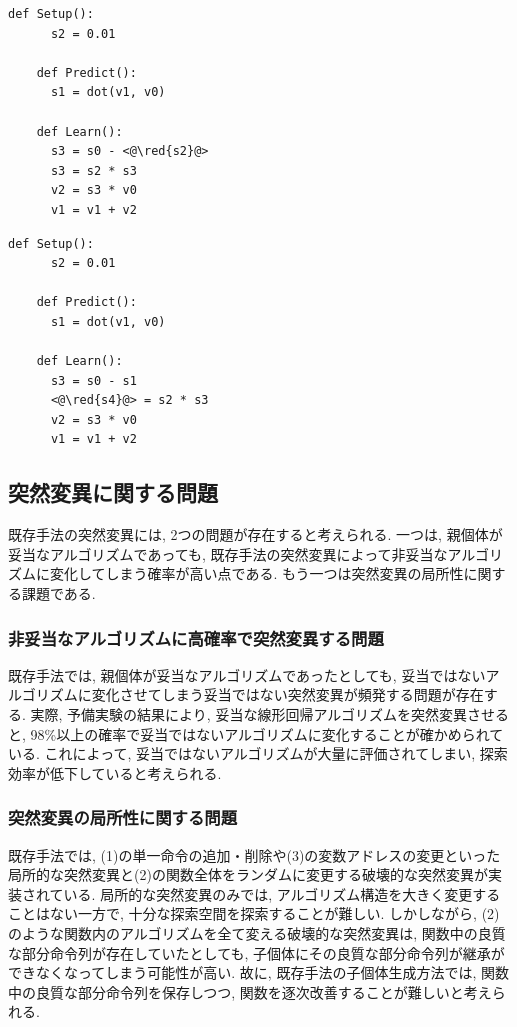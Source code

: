 \documentclass[11pt,oneside,openany,report]{jsbook}
\newcommand{\red}[1]{\textcolor{red}{#1}}
\begin{document}
\begin{multicols}{2}
  \begin{lstlisting}[caption=妥当なアルゴリズムの条件1の(c)を満たさない非妥当なアルゴリズム. ,label=code:invalid_algorithm_6]
    def Setup():
      s2 = 0.01

    def Predict():
      s1 = dot(v1, v0)

    def Learn():
      s3 = s0 - <@\red{s2}@>
      s3 = s2 * s3
      v2 = s3 * v0
      v1 = v1 + v2
  \end{lstlisting}

  \columnbreak

  \begin{lstlisting}[caption=妥当なアルゴリズムの条件3を満たさない非妥当なアルゴリズム,label=code:invalid_algorithm_7]
    def Setup():
      s2 = 0.01

    def Predict():
      s1 = dot(v1, v0)

    def Learn():
      s3 = s0 - s1
      <@\red{s4}@> = s2 * s3
      v2 = s3 * v0
      v1 = v1 + v2
  \end{lstlisting}
\end{multicols}

\subsection{突然変異に関する問題}\label{subsec:problem:existing_problem:mutation}

既存手法の突然変異には, 2つの問題が存在すると考えられる. 一つは, 親個体が妥当なアルゴリズムであっても, 既存手法の突然変異によって非妥当なアルゴリズムに変化してしまう確率が高い点である. もう一つは突然変異の局所性に関する課題である.

\subsubsection{非妥当なアルゴリズムに高確率で突然変異する問題}
既存手法では, 親個体が妥当なアルゴリズムであったとしても, 妥当ではないアルゴリズムに変化させてしまう妥当ではない突然変異が頻発する問題が存在する. 実際, 予備実験の結果により, 妥当な線形回帰アルゴリズムを突然変異させると, 98\%以上の確率で妥当ではないアルゴリズムに変化することが確かめられている. これによって, 妥当ではないアルゴリズムが大量に評価されてしまい, 探索効率が低下していると考えられる.

\subsubsection{突然変異の局所性に関する問題}
既存手法では, (1)の単一命令の追加・削除や(3)の変数アドレスの変更といった局所的な突然変異と(2)の関数全体をランダムに変更する破壊的な突然変異が実装されている. 局所的な突然変異のみでは, アルゴリズム構造を大きく変更することはない一方で, 十分な探索空間を探索することが難しい. しかしながら, (2)のような関数内のアルゴリズムを全て変える破壊的な突然変異は, 関数中の良質な部分命令列が存在していたとしても, 子個体にその良質な部分命令列が継承ができなくなってしまう可能性が高い. 故に, 既存手法の子個体生成方法では, 関数中の良質な部分命令列を保存しつつ, 関数を逐次改善することが難しいと考えられる.
\end{document}
